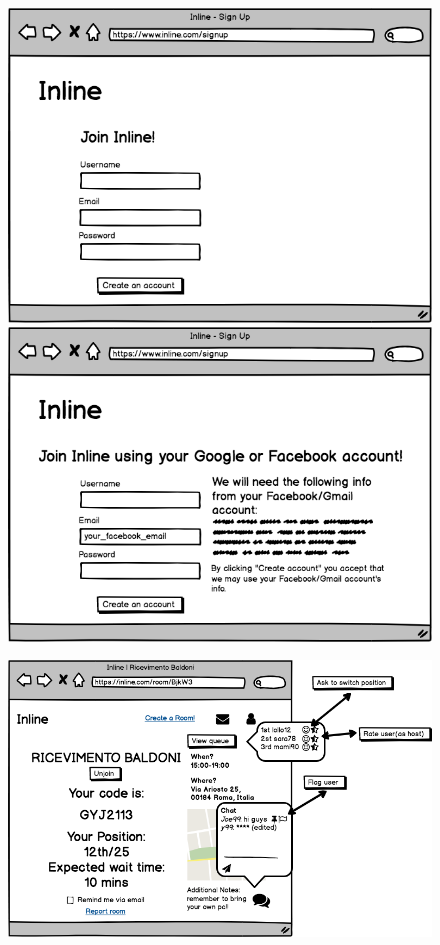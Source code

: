 	\begin{figure}[H]
		\centering
		\begin{minipage}[b]{0.45\textwidth}
			\includegraphics[width=\textwidth]{./Mockup/signup.png}
		\end{minipage}
		\hfill
		\begin{minipage}[b]{0.45\textwidth}
			\includegraphics[width=\textwidth]{./Mockup/oauth.png}
		\end{minipage}
	\end{figure}

	\begin{figure}[H]
		\centering
		\begin{minipage}[b]{0.85\textwidth}
			\includegraphics[width=\textwidth]{./Mockup/room.png}
		\end{minipage}
	\end{figure}
